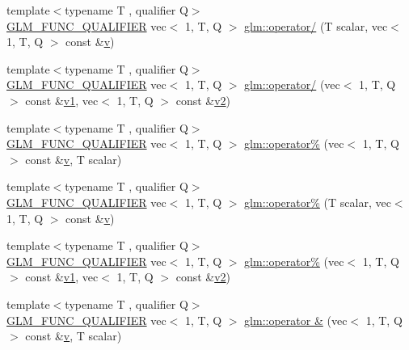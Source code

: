 \begin{DoxyCompactItemize}
\item 
{\footnotesize template$<$typename T , qualifier Q$>$ }\\\hyperlink{setup_8hpp_a33fdea6f91c5f834105f7415e2a64407}{G\+L\+M\+\_\+\+F\+U\+N\+C\+\_\+\+Q\+U\+A\+L\+I\+F\+I\+ER} vec$<$ 1, T, Q $>$ \hyperlink{group__ext__vec1_ga851316b0b0cb8d83400d192036a1b128}{glm\+::operator/} (T scalar, vec$<$ 1, T, Q $>$ const \&\hyperlink{_s_d_l__opengl_8h_a10a82eabcb59d2fcd74acee063775f90}{v})
\item 
{\footnotesize template$<$typename T , qualifier Q$>$ }\\\hyperlink{setup_8hpp_a33fdea6f91c5f834105f7415e2a64407}{G\+L\+M\+\_\+\+F\+U\+N\+C\+\_\+\+Q\+U\+A\+L\+I\+F\+I\+ER} vec$<$ 1, T, Q $>$ \hyperlink{group__ext__vec1_ga1199db3fccd25c9b695894159fa12ac8}{glm\+::operator/} (vec$<$ 1, T, Q $>$ const \&\hyperlink{_s_d_l__opengl__glext_8h_a435c176a02c061b43e19bdf7c86cceae}{v1}, vec$<$ 1, T, Q $>$ const \&\hyperlink{_s_d_l__opengl__glext_8h_a0928f6d0f0f794ba000a21dfae422136}{v2})
\item 
{\footnotesize template$<$typename T , qualifier Q$>$ }\\\hyperlink{setup_8hpp_a33fdea6f91c5f834105f7415e2a64407}{G\+L\+M\+\_\+\+F\+U\+N\+C\+\_\+\+Q\+U\+A\+L\+I\+F\+I\+ER} vec$<$ 1, T, Q $>$ \hyperlink{group__ext__vec1_gac7110fb284669c629075b3ab29ad9b4f}{glm\+::operator\%} (vec$<$ 1, T, Q $>$ const \&\hyperlink{_s_d_l__opengl_8h_a10a82eabcb59d2fcd74acee063775f90}{v}, T scalar)
\item 
{\footnotesize template$<$typename T , qualifier Q$>$ }\\\hyperlink{setup_8hpp_a33fdea6f91c5f834105f7415e2a64407}{G\+L\+M\+\_\+\+F\+U\+N\+C\+\_\+\+Q\+U\+A\+L\+I\+F\+I\+ER} vec$<$ 1, T, Q $>$ \hyperlink{group__ext__vec1_gafaa74182cb9679e2b23567fc4da42bf8}{glm\+::operator\%} (T scalar, vec$<$ 1, T, Q $>$ const \&\hyperlink{_s_d_l__opengl_8h_a10a82eabcb59d2fcd74acee063775f90}{v})
\item 
{\footnotesize template$<$typename T , qualifier Q$>$ }\\\hyperlink{setup_8hpp_a33fdea6f91c5f834105f7415e2a64407}{G\+L\+M\+\_\+\+F\+U\+N\+C\+\_\+\+Q\+U\+A\+L\+I\+F\+I\+ER} vec$<$ 1, T, Q $>$ \hyperlink{group__ext__vec1_ga1a6ce0ed38acf01fa29b2ad451175496}{glm\+::operator\%} (vec$<$ 1, T, Q $>$ const \&\hyperlink{_s_d_l__opengl__glext_8h_a435c176a02c061b43e19bdf7c86cceae}{v1}, vec$<$ 1, T, Q $>$ const \&\hyperlink{_s_d_l__opengl__glext_8h_a0928f6d0f0f794ba000a21dfae422136}{v2})
\item 
{\footnotesize template$<$typename T , qualifier Q$>$ }\\\hyperlink{setup_8hpp_a33fdea6f91c5f834105f7415e2a64407}{G\+L\+M\+\_\+\+F\+U\+N\+C\+\_\+\+Q\+U\+A\+L\+I\+F\+I\+ER} vec$<$ 1, T, Q $>$ \hyperlink{group__ext__vec1_ga62a75b0dadc3e908b03bf03bee891e6d}{glm\+::operator \&} (vec$<$ 1, T, Q $>$ const \&\hyperlink{_s_d_l__opengl_8h_a10a82eabcb59d2fcd74acee063775f90}{v}, T scalar)

\end{DoxyCompactItemize}
